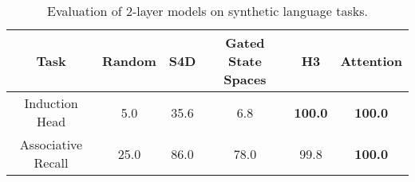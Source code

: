\begin{table}[h]
    \small
    \centering
    \caption{\label{table:synthetics} Evaluation of 2-layer models on synthetic language tasks.}
    {
        \begin{tabular}{@{}|c|c|ccc|c|@{}}
        \hline
        Task & Random & S4D & Gated State Spaces & H3 & Attention  \\ %
        \hline
        Induction Head & 5.0 & 35.6 & 6.8 & \textbf{100.0} & \textbf{100.0} \\
        Associative Recall & 25.0 & 86.0 & 78.0 & 99.8 & \textbf{100.0}  \\ \hline
        \end{tabular}
    }
\end{table}

